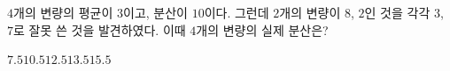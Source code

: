 $4$개의 변량의 평균이 $3$이고, 분산이 $10$이다. 그런데 $2$개의 변량이 $8$, $2$인 것을 각각 $3$, $7$로 잘못 쓴 것을 발견하였다. 이때 $4$개의 변량의 실제 분산은?
\begin{choices32}{$7.5$}{$10.5$}{$12.5$}{$13.5$}{$15.5$}\end{choices32}
